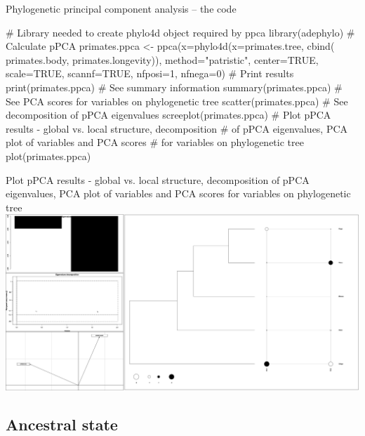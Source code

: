 \documentclass[compress, ucs, xelatex, 11pt, xcolor=svgnames,
  hyperref={
    bookmarks=true,
    unicode=true,
    colorlinks=true,
    pdftitle={Molecular data in R},
    plainpages=false,
    pdfauthor={Vojtech Zeisek},
    pdfsubject={Course about phylogeny and evolution in R},
    pdfcreator={XeLaTeX},
    pdfkeywords={R, evolution, phylogeny, molecular data},
    linkcolor=Tomato,
    anchorcolor=SaddleBrown,
    citecolor=Goldenrod,
    filecolor=DarkMagenta,
    menucolor=Sienna,
    urlcolor=DarkTurquoise,
    pdftex},
  url={hyphens, lowtilde} %
  ]{beamer}
\begin{document}
\begin{frame}[fragile]{Phylogenetic principal component analysis -- the code}
  \begin{spluscode}
    # Library needed to create phylo4d object required by ppca
    library(adephylo)
    # Calculate pPCA
    primates.ppca <- ppca(x=phylo4d(x=primates.tree, cbind(
      primates.body, primates.longevity)), method="patristic",
      center=TRUE, scale=TRUE, scannf=TRUE, nfposi=1, nfnega=0)
    # Print results
    print(primates.ppca)
    # See summary information
    summary(primates.ppca)
    # See PCA scores for variables on phylogenetic tree
    scatter(primates.ppca)
    # See decomposition of pPCA eigenvalues
    screeplot(primates.ppca)
    # Plot pPCA results - global vs. local structure, decomposition
    # of pPCA eigenvalues, PCA plot of variables and PCA scores
    # for variables on phylogenetic tree
    plot(primates.ppca)
  \end{spluscode}
\end{frame}

\begin{frame}{Plot pPCA results - global vs. local structure, decomposition of pPCA eigenvalues, PCA plot of variables and PCA scores for variables on phylogenetic tree}
  \includegraphics[width=\textwidth]{ppca.png}
\end{frame}

\subsection{Ancestral state}
\end{document}
